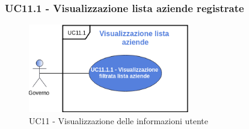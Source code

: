 \subsubsection{UC11.1 - Visualizzazione lista aziende registrate}
\begin{figure}[H]
	\includegraphics[width=7cm]{res/images/UC11-VisualizzazioneFiltrata.png}
	\centering
	\caption{UC11 - Visualizzazione delle informazioni utente}
	
\end{figure}
